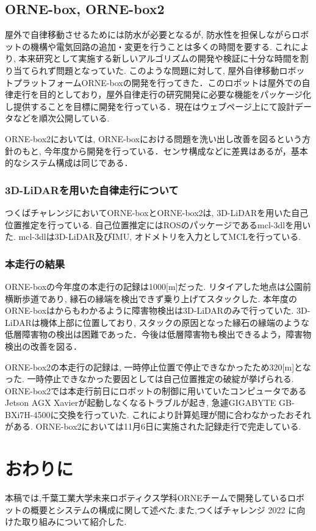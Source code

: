 \documentclass[uplatex, twocolumn, 9pt]{jsproceedings}
\begin{document}
\subsection{ORNE-box, ORNE-box2}
屋外で自律移動させるためには防水が必要となるが, 防水性を担保しながらロボットの機構や電気回路の追加・変更を行うことは多くの時間を要する. これにより, 本来研究として実施する新しいアルゴリズムの開発や検証に十分な時間を割り当てられず問題となっていた. このような問題に対して, 屋外自律移動ロボットプラットフォームORNE-boxの開発\cite{si-box}を行ってきた．このロボットは屋外での自律走行を目的としており，屋外自律走行の研究開発に必要な機能をパッケージ化し提供することを目標に開発を行っている．現在はウェブページ上\cite{box}にて設計データなどを順次公開している. \par 
ORNE-box2においては, ORNE-boxにおける問題を洗い出し改善を図るという方針のもと, 今年度から開発を行っている．センサ構成などに差異はあるが，基本的なシステム構成は同じである．

\subsubsection{3D-LiDARを用いた自律走行について}
つくばチャレンジにおいてORNE-boxとORNE-box2は, 3D-LiDARを用いた自己位置推定を行っている. 自己位置推定にはROSのパッケージであるmcl-3dl\cite{mcl-3dl}を用いた. mcl-3dlは3D-LiDAR及びIMU, オドメトリを入力としてMCLを行っている.

\subsubsection{本走行の結果}
ORNE-boxの今年度の本走行の記録は1000[m]だった. リタイアした地点は公園前横断歩道であり, 縁石の縁端を検出できず乗り上げてスタックした. 本年度のORNE-boxはからもわかるように障害物検出は3D-LiDARのみで行っていた. 3D-LiDARは機体上部に位置しており, スタックの原因となった縁石の縁端のような低層障害物の検出は困難であった．今後は低層障害物も検出できるよう，障害物検出の改善を図る．\par
ORNE-box2の本走行の記録は, 一時停止位置で停止できなかったため320[m]となった. 一時停止できなかった要因としては自己位置推定の破綻が挙げられる. ORNE-box2では本走行前日にロボットの制御に用いていたコンピュータであるJetson AGX Xavierが起動しなくなるトラブルが起き, 急遽GIGABYTE GB-BXi7H-4500に交換を行っていた. これにより計算処理が間に合わなかったおそれがある. ORNE-box2においては11月6日に実施された記録走行で完走している. 

\section{おわりに}
本稿では,千葉工業大学未来ロボティクス学科ORNEチームで開発しているロボットの概要とシステムの構成に関して述べた.また,つくばチャレンジ 2022 に向けた取り組みについて紹介した.
\end{document}
